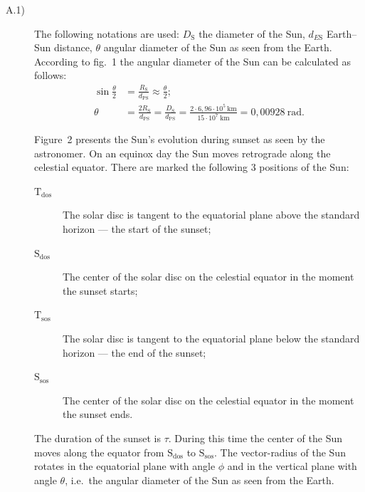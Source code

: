 \begin{description}
\item[A.1)] The following notations are used: $D_{\mathrm{S}}$ the diameter
  of the Sun, $d_{E\mathrm{S}}$ Earth--Sun distance, $\theta$ angular
  diameter of the Sun as seen from the Earth.
  According to fig.~1 the angular diameter of the Sun can be calculated as
  follows:
  \begin{align*}
  \sin\frac{\theta}{2} &= \frac{R_{\mathrm{S}}}{d_{\mathrm{PS}}}
    \approx \frac{\theta}{2};
  \\
  \theta &= \frac{2R_{\mathrm{S}}}{d_{\mathrm{PS}}}
    = \frac{D_{\mathrm{S}}}{d_{\mathrm{PS}}}
    = \frac{2\cdot 6{,}96\cdot 10^{5}\ \mathrm{km}}{15\cdot 10^{7}\ \mathrm{km}}
    = 0{,}00928\ \mathrm{rad}.
  \end{align*}

  Figure~2 presents the Sun's evolution during sunset as seen by the
  astronomer. On an equinox day the Sun moves retrograde along the celestial
  equator. There are marked the following 3 positions of the Sun:
  \begin{description}
  \item[$\mathrm{T_{dos}}$] The solar disc is tangent to the equatorial plane
    above the standard horizon --- the start of the sunset;
  \item[$\mathrm{S_{dos}}$] The center of the solar disc on the celestial
    equator in the moment the sunset starts;
  \item[$\mathrm{T_{sos}}$] The solar disc is tangent to the equatorial plane
    below the standard horizon --- the end of the sunset;
  \item[$\mathrm{S_{sos}}$] The center of the solar disc on the celestial
    equator in the moment the sunset ends.
  \end{description}

  The duration of the sunset is $\tau$. During this time the center of the
  Sun moves along the equator from $\mathrm{S_{dos}}$ to $\mathrm{S_{sos}}$.
  The vector-radius of the Sun rotates in the equatorial plane with angle
  $\phi$ and in the vertical plane with angle $\theta$, i.e.\ the angular
  diameter of the Sun as seen from the Earth.


\end{description}

